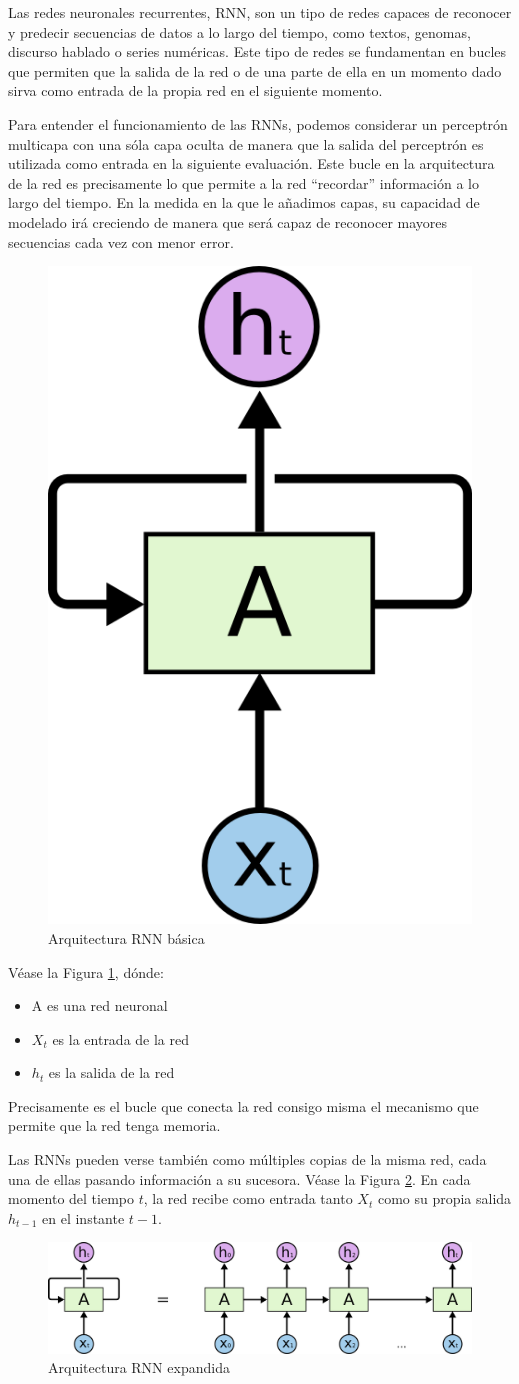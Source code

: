 \documentclass[]{book}
\providecommand{\tightlist}{%
  \setlength{\itemsep}{0pt}\setlength{\parskip}{0pt}}
\begin{document}
Las redes neuronales recurrentes, RNN, son un tipo de redes capaces de
reconocer y predecir secuencias de datos a lo largo del tiempo, como
textos, genomas, discurso hablado o series numéricas. Este tipo de redes
se fundamentan en bucles que permiten que la salida de la red o de una
parte de ella en un momento dado sirva como entrada de la propia red en
el siguiente momento.

Para entender el funcionamiento de las RNNs, podemos considerar un
perceptrón multicapa con una sóla capa oculta de manera que la salida
del perceptrón es utilizada como entrada en la siguiente evaluación.
Este bucle en la arquitectura de la red es precisamente lo que permite a
la red ``recordar'' información a lo largo del tiempo. En la medida en
la que le añadimos capas, su capacidad de modelado irá creciendo de
manera que será capaz de reconocer mayores secuencias cada vez con menor
error.

\begin{figure}[H]

{\centering \includegraphics[width=0.1\linewidth]{images/RNN_basic} 

}

\caption{Arquitectura RNN básica}\label{fig:RNN-basic}
\end{figure}

Véase la Figura \ref{fig:RNN-basic}, dónde:

\begin{itemize}
\tightlist
\item
  \(\text{A}\) es una red neuronal
\item
  \(X_t\) es la entrada de la red
\item
  \(h_t\) es la salida de la red
\end{itemize}

Precisamente es el bucle que conecta la red consigo misma el mecanismo
que permite que la red tenga memoria.

Las RNNs pueden verse también como múltiples copias de la misma red,
cada una de ellas pasando información a su sucesora. Véase la Figura
\ref{fig:RNN-unrolled}. En cada momento del tiempo \(t\), la red recibe
como entrada tanto \(X_t\) como su propia salida \(h_{t-1}\) en el
instante \(t-1\).

\begin{figure}[H]

{\centering \includegraphics[width=0.6\linewidth]{images/RNN_unrolled} 

}

\caption{Arquitectura RNN expandida}\label{fig:RNN-unrolled}
\end{figure}
\end{document}
